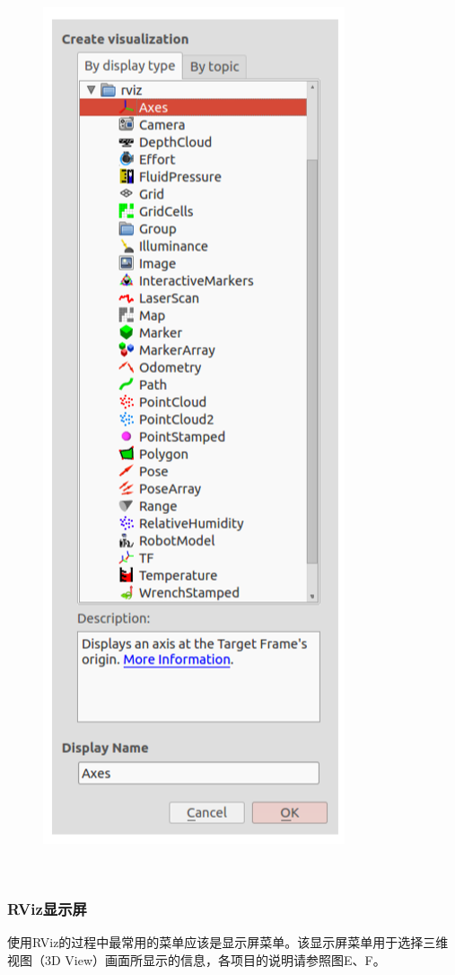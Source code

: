 \documentclass[geye,green,kindle,cn]{elegantnote}
\begin{document}
\begin{figure}[htbp]
    \centering
    \includegraphics[width=0.45\linewidth]{src/D.png}
    \centering
    \caption{} \label{picture:}
\end{figure}
\subsubsection{RViz显示屏}
使用RViz的过程中最常用的菜单应该是显示屏菜单。该显示屏菜单用于选择三维视图（3D View）画面所显示的信息，各项目的说明请参照图E、F。
\end{document}
